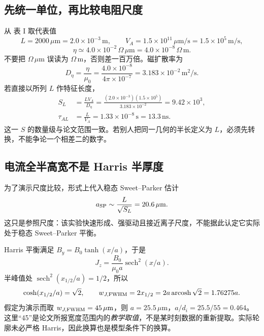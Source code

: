\subsection{先统一单位，再比较电阻尺度}

从 \citet{TMPearcy2024} 表 I 取代表值
\begin{equation}
 L=2000\,\mu\mathrm m=2.0\times10^{-3}\,\mathrm m,
 \qquad V_A=1.5\times10^{11}\,\mu\mathrm{m/s}
 =1.5\times10^5\,\mathrm{m/s},
\end{equation}
\begin{equation}
 \eta\simeq4.0\times10^{-2}\,\Omega\,\mu\mathrm m
 =4.0\times10^{-8}\,\Omega\,\mathrm m.
\end{equation}
不要把 $\Omega\,\mu\mathrm m$ 误读为 $\Omega\,\mathrm m$，否则差一百万倍。磁扩散率为
\begin{equation}
 D_\eta=\frac{\eta}{\mu_0}
 =\frac{4.0\times10^{-8}}{4\pi\times10^{-7}}
 =3.183\times10^{-2}\,\mathrm{m^2/s}.
\end{equation}
若直接以所列 $L$ 作特征长度，
\begin{align}
 S_L&=\frac{LV_A}{D_\eta}
 =\frac{(2.0\times10^{-3})(1.5\times10^5)}{3.183\times10^{-2}}
 =9.42\times10^3,\\
 \tau_{AL}&=\frac L{V_A}=1.33\times10^{-8}\,\mathrm s=13.3\,\mathrm{ns}.
\end{align}
这一 $S$ 的数量级与论文范围一致。若别人把同一几何的半长定义为 $L$，必须先转换，不能争论一个相差二的数字。

\subsection{电流全半高宽不是 Harris 半厚度}

为了演示尺度比较，形式上代入稳态 Sweet--Parker 估计
\begin{equation}
 a_{\rm SP}\sim\frac L{\sqrt{S_L}}
 =20.6\,\mu\mathrm m.
\end{equation}
这只是参照尺度：该实验快速形成、强驱动且接近离子尺度，不能据此认定它实际处于稳态 Sweet--Parker 平衡。

Harris 平衡满足 $B_y=B_0\tanh(x/a)$，于是
\begin{equation}
 J_z=\frac{B_0}{\mu_0a}\operatorname{sech}^2(x/a).
\end{equation}
半峰值处 $\operatorname{sech}^2(x_{1/2}/a)=1/2$，所以
\begin{equation}
 \cosh(x_{1/2}/a)=\sqrt2,\qquad
 w_{J,\rm FWHM}=2x_{1/2}=2a\operatorname{arcosh}\sqrt2=1.76275a.
\end{equation}
假定为演示而取 $w_{J,\rm FWHM}=45\,\mu\mathrm m$，则 $a=25.5\,\mu\mathrm m$，$a/d_i=25.5/55=0.464$。这里“45”是论文所报宽度范围内的\emph{教学取值}，不是某时刻数据的重新提取。实际轮廓未必严格 Harris，因此换算也是模型条件下的换算。

